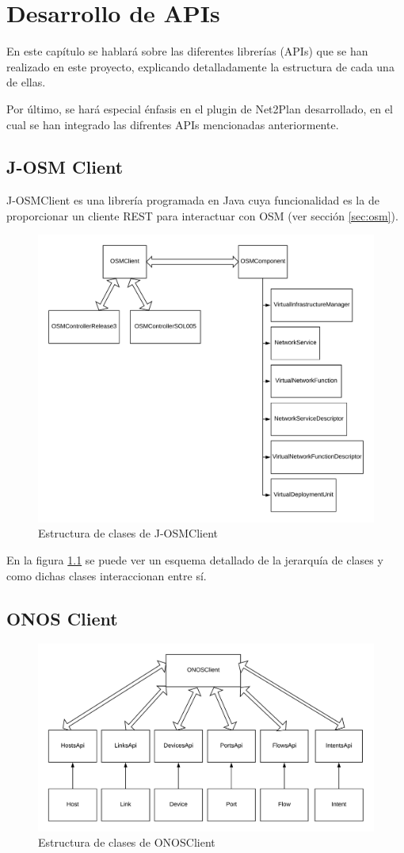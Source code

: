 \chapter{Desarrollo de APIs}

En este capítulo se hablará sobre las diferentes librerías (APIs) que se han realizado en este proyecto, explicando detalladamente la estructura de cada una de ellas.

Por último, se hará especial énfasis en el plugin de Net2Plan desarrollado, en el cual se han integrado las difrentes APIs mencionadas anteriormente.


\section{J-OSM Client}
\label{sec:osmclient}

J-OSMClient es una librería programada en Java cuya funcionalidad es la de proporcionar un cliente REST para interactuar con OSM (ver sección \ref{sec:osm}).

\begin{figure}[!ht]
	\centering
	\includegraphics[width=0.7\linewidth]{imagenes/OSMClient}
	\caption{Estructura de clases de J-OSMClient}
	\label{fig:osmclient}
\end{figure}

En la figura \ref{fig:osmclient} se puede ver un esquema detallado de la jerarquía de clases y como dichas clases interaccionan entre sí.


\section{ONOS Client}
\label{sec:onosclient}

\begin{figure}[!ht]
	\centering
	\includegraphics[width=0.7\linewidth]{imagenes/ONOSClient}
	\caption{Estructura de clases de ONOSClient}
	\label{fig:onosclient}
\end{figure}


